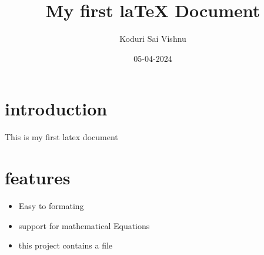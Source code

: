 \documentclass{article}
\title{My first laTeX Document}
\author{Koduri Sai Vishnu}
\date{05-04-2024}
\begin{document}
\maketitle
\section{introduction}
This is my first latex document
\section{features}
\begin{itemize}
\item Easy to formating
\item support for mathematical Equations
\item this project contains a file
\end{itemize}
\end{document}
